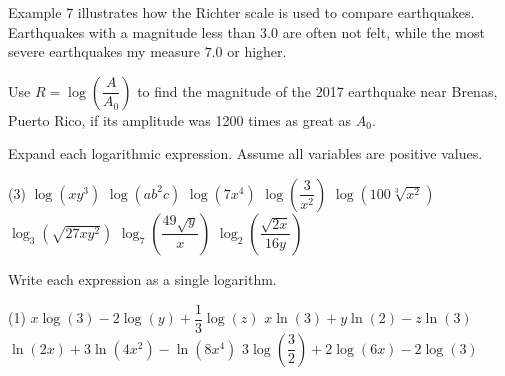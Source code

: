 \begin{exer}
    Example 7 illustrates how the Richter scale is used to compare earthquakes.
    Earthquakes with a magnitude less than $3.0$ are often not felt, while the most severe earthquakes my measure $7.0$ or higher.

    Use $R = \log \left(\dfrac{A}{A_0}\right)$ to find the magnitude of the 2017 earthquake near Brenas, Puerto Rico, if its amplitude was 1200 times as great as $A_0$.
\end{exer}

\begin{exer}
    Expand each logarithmic expression.
    Assume all variables are positive values.
    \begin{tasks}(3)
        \task $\log (xy^3)$
        \task $\log (ab^2 c)$
        \task $\log (7x^4)$
        \task $\log \left(\dfrac{3}{x^2}\right)$
        \task $\log \left(100 \sqrt[3]{x^2}\right)$
        \task $\log_3 \left(\sqrt {27xy^2}\right)$
        \task $\log_7 \left(\dfrac{49\sqrt {y}}{x}\right)$
        \task $\log_2 \left(\dfrac{\sqrt {2x}}{16y}\right)$
    \end{tasks}
\end{exer}

\begin{exer}
    Write each expression as a single logarithm.
    \begin{tasks}(1)
        \task $x\log (3) - 2\log (y) + \dfrac{1}{3}\log (z)$
        \task $x\ln (3) + y\ln (2) - z\ln (3)$
        \task $\ln (2x) + 3\ln (4x^2) - \ln (8x^4)$
        \task $3\log \left(\dfrac{3}{2}\right) + 2\log (6x) - 2\log (3)$
    \end{tasks}
\end{exer}